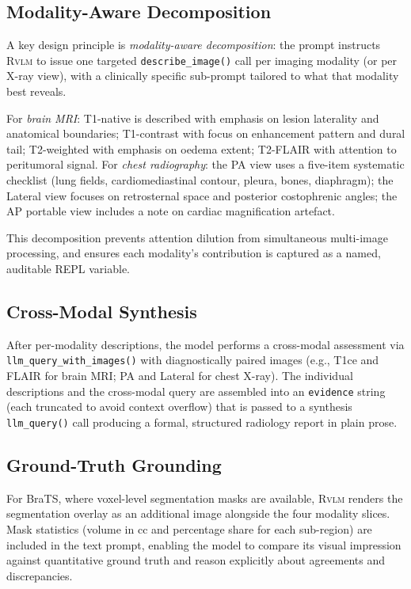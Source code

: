 \documentclass{article}
\newcommand{\RVLM}{\textsc{Rvlm}}
\begin{document}
	\subsection{Modality-Aware Decomposition}
	\label{sec:modality-decomposition}
	
	A key design principle is \emph{modality-aware decomposition}: the prompt
	instructs \RVLM{} to issue one targeted \texttt{describe\_image()} call per
	imaging modality (or per X-ray view), with a clinically specific sub-prompt
	tailored to what that modality best reveals.
	
	For \emph{brain MRI}: T1-native is described with emphasis on lesion
	laterality and anatomical boundaries; T1-contrast with focus on enhancement
	pattern and dural tail; T2-weighted with emphasis on oedema extent; T2-FLAIR
	with attention to peritumoral signal.
	For \emph{chest radiography}: the PA view uses a five-item systematic
	checklist (lung fields, cardiomediastinal contour, pleura, bones, diaphragm);
	the Lateral view focuses on retrosternal space and posterior costophrenic
	angles; the AP portable view includes a note on cardiac magnification
	artefact.
	
	This decomposition prevents attention dilution from simultaneous multi-image
	processing, and ensures each modality's contribution is captured as a named,
	auditable REPL variable.
	
	\subsection{Cross-Modal Synthesis}
	\label{sec:cross-modal}
	
	After per-modality descriptions, the model performs a cross-modal assessment
	via \texttt{llm\_query\_with\_images()} with diagnostically paired images
	(e.g., T1ce and FLAIR for brain MRI; PA and Lateral for chest X-ray).
	The individual descriptions and the cross-modal query are assembled into an
	\texttt{evidence} string (each truncated to avoid context overflow) that is
	passed to a synthesis \texttt{llm\_query()} call producing a formal,
	structured radiology report in plain prose.
	
	\subsection{Ground-Truth Grounding}
	\label{sec:gt-grounding}
	
	For BraTS, where voxel-level segmentation masks are available, \RVLM{}
	renders the segmentation overlay as an additional image alongside the four
	modality slices.
	Mask statistics (volume in cc and percentage share for each sub-region) are
	included in the text prompt, enabling the model to compare its visual
	impression against quantitative ground truth and reason explicitly about
	agreements and discrepancies.
	
\end{document}
